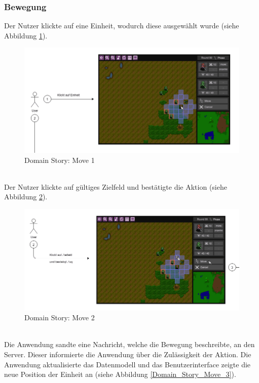 \documentclass[12pt, titlepage]{scrartcl}
\begin{document}
		    \subsubsection{Bewegung}
		    	Der Nutzer klickte auf eine Einheit, wodurch diese  ausgew\"ahlt wurde (siehe Abbildung \ref{Domain_Story_Move_1}).
		    	\begin{figure}[H] 
		    		\centering
		    		\includegraphics[width=\textwidth]{images/domain_stories/moveStory1.png}
		    		\caption{Domain Story: Move 1}
		    		\label{Domain_Story_Move_1}
		    	\end{figure}
				\ \\ Der Nutzer klickte auf g\"ultiges Zielfeld und best\"atigte die Aktion (siehe Abbildung \ref{Domain_Story_Move_2}).
		    	\begin{figure}[H] 
		    		\centering
		    		\includegraphics[width=\textwidth]{images/domain_stories/moveStory2.png}
		    		\caption{Domain Story: Move 2}
		    		\label{Domain_Story_Move_2}
		    	\end{figure}
				\ \\ Die Anwendung sandte eine Nachricht, welche die Bewegung beschreibte, an den Server. Dieser informierte die Anwendung \"uber die Zul\"assigkeit der Aktion. Die Anwendung aktualisierte das Datenmodell und das Benutzerinterface zeigte die neue Position der Einheit an (siehe Abbildung \ref{Domain_Story_Move_3}).
\end{document}
